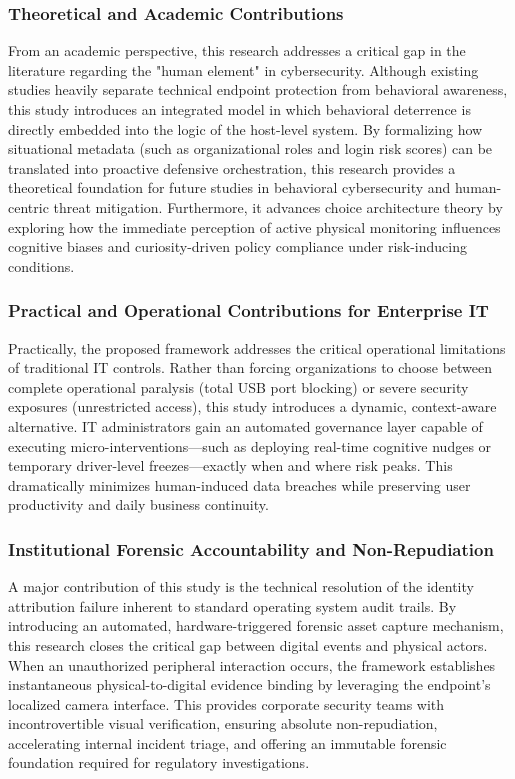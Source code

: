 \documentclass{ieeeaccess}
\begin{document}
\subsubsection{Theoretical and Academic Contributions}
From an academic perspective, this research addresses a critical gap in the literature regarding the "human element" in cybersecurity. Although existing studies heavily separate technical endpoint protection from behavioral awareness, this study introduces an integrated model in which behavioral deterrence is directly embedded into the logic of the host-level system. By formalizing how situational metadata (such as organizational roles and login risk scores) can be translated into proactive defensive orchestration, this research provides a theoretical foundation for future studies in behavioral cybersecurity and human-centric threat mitigation. Furthermore, it advances choice architecture theory by exploring how the immediate perception of active physical monitoring influences cognitive biases and curiosity-driven policy compliance under risk-inducing conditions.

\subsubsection{Practical and Operational Contributions for Enterprise IT}
Practically, the proposed framework addresses the critical operational limitations of traditional IT controls. Rather than forcing organizations to choose between complete operational paralysis (total USB port blocking) or severe security exposures (unrestricted access), this study introduces a dynamic, context-aware alternative. IT administrators gain an automated governance layer capable of executing micro-interventions—such as deploying real-time cognitive nudges or temporary driver-level freezes—exactly when and where risk peaks. This dramatically minimizes human-induced data breaches while preserving user productivity and daily business continuity.

\subsubsection{Institutional Forensic Accountability and Non-Repudiation}
A major contribution of this study is the technical resolution of the identity attribution failure inherent to standard operating system audit trails. By introducing an automated, hardware-triggered forensic asset capture mechanism, this research closes the critical gap between digital events and physical actors. When an unauthorized peripheral interaction occurs, the framework establishes instantaneous physical-to-digital evidence binding by leveraging the endpoint's localized camera interface. This provides corporate security teams with incontrovertible visual verification, ensuring absolute non-repudiation, accelerating internal incident triage, and offering an immutable forensic foundation required for regulatory investigations.
\end{document}
